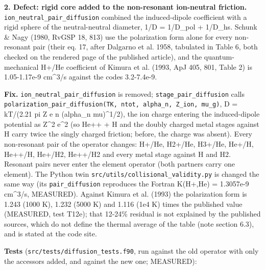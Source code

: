 \documentclass[english,a4paper]{my_memo}
\begin{document}
\textbf{2. Defect: rigid core added to the non-resonant ion-neutral friction.}
\texttt{ion\_neutral\_pair\_diffusion} combined the induced-dipole coefficient with a
rigid sphere of the neutral-neutral diameter, 1/D = 1/D\_pol + 1/D\_hs. Schunk \&
Nagy (1980, RvGSP 18, 813) use the polarization form alone for every
non-resonant pair (their eq. 17, after Dalgarno et al. 1958, tabulated in
Table 6, both checked on the rendered page of the published article), and the
quantum-mechanical H+/He coefficient of Kimura et al. (1993, ApJ 405, 801,
Table 2) is 1.05-1.17e-9 cm\^{}3/s against the code\textquotesingle s 3.2-7.4e-9.

\textbf{Fix.} \texttt{ion\_neutral\_pair\_diffusion} is removed; \texttt{stage\_pair\_diffusion}
calls \texttt{polarization\_pair\_diffusion(TK,\ ntot,\ alpha\_n,\ Z\_ion,\ mu\_g)},
D = kT/(2.21 pi Z e n (alpha\_n mu)\^{}1/2), the ion charge entering the
induced-dipole potential as Z\^{}2 e\^{}2 (so He++ + H and the doubly charged
metal stages against H carry twice the singly charged friction; before, the
charge was absent). Every non-resonant pair of the operator changes: H+/He,
H2+/He, H3+/He, He+/H, He++/H, He+/H2, He++/H2 and every metal stage
against H and H2. Resonant pairs never enter the element operator (both
partners carry one element). The Python twin
\texttt{src/utils/collisional\_validity.py} is changed the same way (its
\texttt{pair\_diffusion} reproduces the Fortran K(H+,He) = 1.3057e-9 cm\^{}3/s,
MEASURED). Against Kimura et al. (1993) the polarization form is 1.243
(1000 K), 1.232 (5000 K) and 1.116 (1e4 K) times the published value
(MEASURED, test T12e); that 12-24\% residual is not explained by the published
sources, which do not define the thermal average of the table (note
section 6.3), and is stated at the code site.

\textbf{Tests} (\texttt{src/tests/diffusion\_tests.f90}, run against the old operator with
only the accessors added, and against the new one; MEASURED):
\end{document}
